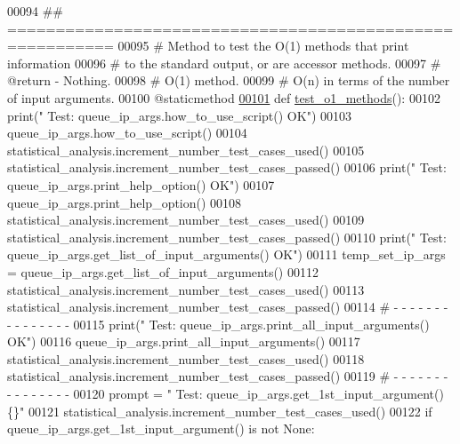 \begin{DoxyCode}
00094     \textcolor{comment}{## =========================================================}
00095     \textcolor{comment}{#   Method to test the O(1) methods that print information}
00096     \textcolor{comment}{#       to the standard output, or are accessor methods.}
00097     \textcolor{comment}{#   @return - Nothing.}
00098     \textcolor{comment}{#   O(1) method.}
00099     \textcolor{comment}{#   O(n) in terms of the number of input arguments.}
00100     @staticmethod
\hypertarget{queue__ip__arguments__tester_8py_source_l00101}{}\hyperlink{classutilities_1_1queue__ip__arguments__tester_1_1queue__ip__args__tester_a49bd049dbf616cc1f604d3c0cbe84c43}{00101}     \textcolor{keyword}{def }\hyperlink{classutilities_1_1queue__ip__arguments__tester_1_1queue__ip__args__tester_a49bd049dbf616cc1f604d3c0cbe84c43}{test\_o1\_methods}():
00102         print(\textcolor{stringliteral}{" Test: queue\_ip\_args.how\_to\_use\_script()         OK"})
00103         queue\_ip\_args.how\_to\_use\_script()
00104         statistical\_analysis.increment\_number\_test\_cases\_used()
00105         statistical\_analysis.increment\_number\_test\_cases\_passed()
00106         print(\textcolor{stringliteral}{" Test: queue\_ip\_args.print\_help\_option()         OK"})
00107         queue\_ip\_args.print\_help\_option()
00108         statistical\_analysis.increment\_number\_test\_cases\_used()
00109         statistical\_analysis.increment\_number\_test\_cases\_passed()
00110         print(\textcolor{stringliteral}{" Test: queue\_ip\_args.get\_list\_of\_input\_arguments()   OK"})
00111         temp\_set\_ip\_args = queue\_ip\_args.get\_list\_of\_input\_arguments()
00112         statistical\_analysis.increment\_number\_test\_cases\_used()
00113         statistical\_analysis.increment\_number\_test\_cases\_passed()
00114         \textcolor{comment}{#   -   -   -   -   -   -   -   -   -   -   -   -   -   -   -}
00115         print(\textcolor{stringliteral}{" Test: queue\_ip\_args.print\_all\_input\_arguments()     OK"})
00116         queue\_ip\_args.print\_all\_input\_arguments()
00117         statistical\_analysis.increment\_number\_test\_cases\_used()
00118         statistical\_analysis.increment\_number\_test\_cases\_passed()
00119         \textcolor{comment}{#   -   -   -   -   -   -   -   -   -   -   -   -   -   -   -}
00120         prompt = \textcolor{stringliteral}{"  Test: queue\_ip\_args.get\_1st\_input\_argument()        \{\}"}
00121         statistical\_analysis.increment\_number\_test\_cases\_used()
00122         \textcolor{keywordflow}{if} queue\_ip\_args.get\_1st\_input\_argument() \textcolor{keywordflow}{is} \textcolor{keywordflow}{not} \textcolor{keywordtype}{None}:

\end{DoxyCode}

